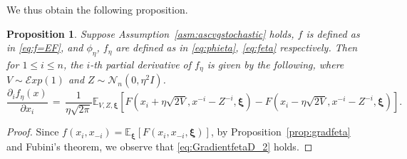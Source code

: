 \documentclass[11pt,reqno]{amsart}
\newcommand{\1}{{\bf 1}}
\newcommand{\2}{{\bf 2}}
\newcommand{\bxi}{\boldsymbol{\xi}}
\numberwithin{equation}{section}
\newtheorem{proposition}{Proposition}[section]
\theoremstyle{remark}
\begin{document}
{				\smallskip
				
				We thus obtain the following proposition.
				\begin{proposition}\label{cor:gradfeta} 
					Suppose Assumption~\ref{asm:ascvgstochastic} holds, $f$ is defined as in \eqref{eq:f=EF}, and $\phi_{\eta}$, $f_{\eta}$ are defined as in \eqref{eq:phieta}, \eqref{eq:feta} respectively. Then for $1 \leq i \leq n$, the $i$-th partial derivative of $f_\eta$ is given by the following, where $V \sim \mathcal{E}xp(1)$ and $Z \sim \mathcal{N}_n(0, \eta^2 I)$.
					\begin{equation}\label{eq:GradientfetaD_2}
						\frac{\partial_i f_{\eta}(x)}{\partial x_i} \,  = \, \frac{1}{\eta \sqrt{2\pi}}\mathbb{E}_{V,Z, \bxi}\left[F\left(x_i+\eta\sqrt{2V},x^{-i}-Z^{-i}, \bxi\right)-F\left(x_i-\eta\sqrt{2V},x^{-i}-Z^{-i}, \bxi\right)\right]. 
					\end{equation}
				\end{proposition}
				\begin{proof}
				Since $f(x_i,x_{-i}) = \mathbb{E}_{\bxi}\left[ F(x_i,x_{-i},\bxi) \right]$, by Proposition~\ref{prop:gradfeta} and Fubini's theorem, 
				we observe that \eqref{eq:GradientfetaD_2} holds.
				\end{proof}
				
}
\end{document}
